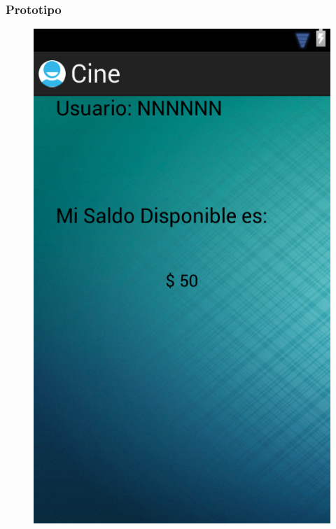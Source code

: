\documentclass{beamer}
\begin{document}
\begin{frame}[allowframbreaks]
\frametitle{Prototipo}
\begin{figure}[h]
\centering
\includegraphics[height=1.0\textheight]{saldo.png}
\end{figure}
\end{frame}
\end{document}

